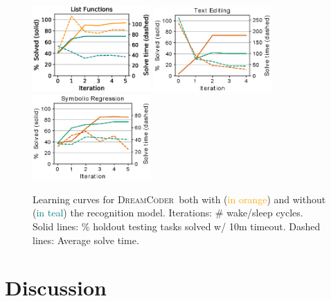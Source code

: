 \documentclass{article}
\newcommand{\system}{\textsc{DreamCoder}~}
\newcommand{\orange}[1]{\textcolor{orange}{#1}}
\newcommand{\teal}[1]{\textcolor{teal}{#1}}
\begin{document}
\begin{figure}\centering
  \includegraphics[width = 4.5cm]{figures/listLearningCurve.eps} \qquad
  \includegraphics[width = 4.5cm]{figures/textLearningCurve.eps}\qquad
  \includegraphics[width = 4.5cm]{figures/rationalCurve.eps}
  \caption{Learning curves for \system both with (\orange{in orange}) and without
    (\teal{in teal}) the recognition model. Iterations: \# wake/sleep cycles. Solid lines: \% holdout testing tasks solved w/ 10m timeout. Dashed lines: Average solve time.}\label{learningCurves}\vspace{-0.5cm}
\end{figure}

\section{Discussion}
\end{document}
